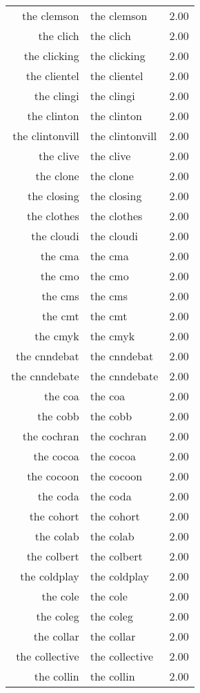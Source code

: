 \begin{table}[ht]
\begin{tabular}{rlr}
  the clemson & the clemson & 2.00 \\ 
  the clich & the clich & 2.00 \\ 
  the clicking & the clicking & 2.00 \\ 
  the clientel & the clientel & 2.00 \\ 
  the clingi & the clingi & 2.00 \\ 
  the clinton & the clinton & 2.00 \\ 
  the clintonvill & the clintonvill & 2.00 \\ 
  the clive & the clive & 2.00 \\ 
  the clone & the clone & 2.00 \\ 
  the closing & the closing & 2.00 \\ 
  the clothes & the clothes & 2.00 \\ 
  the cloudi & the cloudi & 2.00 \\ 
  the cma & the cma & 2.00 \\ 
  the cmo & the cmo & 2.00 \\ 
  the cms & the cms & 2.00 \\ 
  the cmt & the cmt & 2.00 \\ 
  the cmyk & the cmyk & 2.00 \\ 
  the cnndebat & the cnndebat & 2.00 \\ 
  the cnndebate & the cnndebate & 2.00 \\ 
  the coa & the coa & 2.00 \\ 
  the cobb & the cobb & 2.00 \\ 
  the cochran & the cochran & 2.00 \\ 
  the cocoa & the cocoa & 2.00 \\ 
  the cocoon & the cocoon & 2.00 \\ 
  the coda & the coda & 2.00 \\ 
  the cohort & the cohort & 2.00 \\ 
  the colab & the colab & 2.00 \\ 
  the colbert & the colbert & 2.00 \\ 
  the coldplay & the coldplay & 2.00 \\ 
  the cole & the cole & 2.00 \\ 
  the coleg & the coleg & 2.00 \\ 
  the collar & the collar & 2.00 \\ 
  the collective & the collective & 2.00 \\ 
  the collin & the collin & 2.00 \\ 

\end{tabular}
\end{table}
